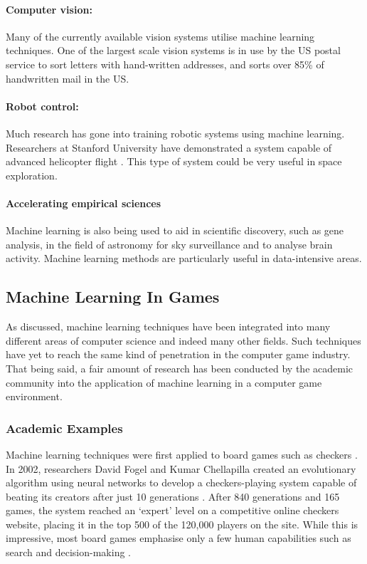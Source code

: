 \documentclass[a4paper,oneside]{report}
\begin{document}
\paragraph{Computer vision:} Many of the currently available vision systems utilise machine learning techniques. One of the largest scale vision systems is in use by the US postal service to sort letters with hand-written addresses, and sorts over 85\% of handwritten mail in the US.

\paragraph{Robot control:} Much research has gone into training robotic systems using machine learning. Researchers at Stanford University have demonstrated a system capable of advanced helicopter flight \cite{Ng:2004dz, Abbeel07anapplication, Abbeel:fu}. This type of system could be very useful in space exploration.

\paragraph{Accelerating empirical sciences} Machine learning is also being used to aid in scientific discovery, such as gene analysis, in the field of astronomy for sky surveillance and to analyse brain activity. Machine learning methods are particularly useful in data-intensive areas.

\subsection{Machine Learning In Games}

As discussed, machine learning techniques have been integrated into many different areas of computer science and indeed many other fields. Such techniques have yet to reach the same kind of penetration in the computer game industry. That being said, a fair amount of research has been conducted by the academic community into the application of machine learning in a computer game environment. 

\subsubsection{Academic Examples}

Machine learning techniques were first applied to board games such as checkers \cite{Samuel:1959qo, Samuel:1967ye}. In 2002, researchers David Fogel and Kumar Chellapilla created an evolutionary algorithm using neural networks to develop a checkers-playing system capable of beating its creators after just 10 generations \cite{Fogel:2003fk}. After 840 generations and 165 games, the system reached an `expert' level on a competitive online checkers website, placing it in the top 500 of the 120,000 players on the site. While this is impressive, most board games emphasise only a few human capabilities such as search and decision-making \cite{Laird:2001tw}. 
\end{document}
